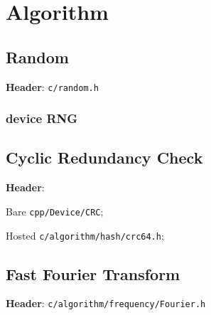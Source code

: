 \section{Algorithm}



\subsection{Random}

\textbf{Header}: \verb|c/random.h|



\subsubsection{device RNG}



\subsection{Cyclic Redundancy Check}

\textbf{Header}:

Bare \verb|cpp/Device/CRC|;

Hosted \verb|c/algorithm/hash/crc64.h|;



\subsection{Fast Fourier Transform}

\textbf{Header}: \verb|c/algorithm/frequency/Fourier.h|

